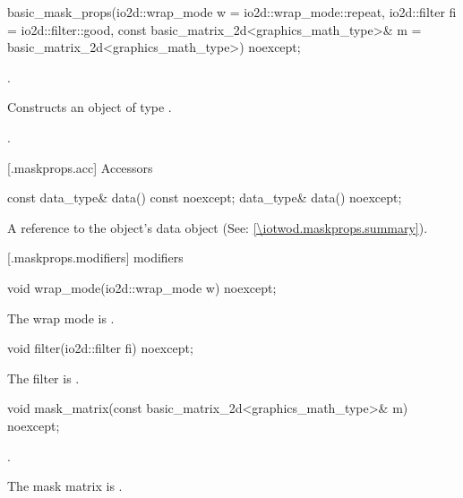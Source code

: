 %
\begin{itemdecl}
basic_mask_props(io2d::wrap_mode w = io2d::wrap_mode::repeat,
  io2d::filter fi = io2d::filter::good,
  const basic_matrix_2d<graphics_math_type>& m = basic_matrix_2d<graphics_math_type>{}) noexcept;
\end{itemdecl}
\begin{itemdescr}
\requires
{}.

\pnum
\effects
Constructs an object of type .

\pnum
\postconditions
{}.
\end{itemdescr}

 [\iotwod.maskprops.acc] {Accessors}

%
\begin{itemdecl}
const data_type& data() const noexcept;
data_type& data() noexcept;
\end{itemdecl}
\begin{itemdescr}
\pnum
\returns A reference to the  object's data object (See: \ref{\iotwod.maskprops.summary}).
\end{itemdescr}

 [\iotwod.maskprops.modifiers] { modifiers}

%
\begin{itemdecl}
void wrap_mode(io2d::wrap_mode w) noexcept;
\end{itemdecl}
\begin{itemdescr}
\pnum
\effects
The wrap mode is .
\end{itemdescr}

%
\begin{itemdecl}
void filter(io2d::filter fi) noexcept;
\end{itemdecl}
\begin{itemdescr}
\pnum
\effects
The filter is .
\end{itemdescr}

%
\begin{itemdecl}
void mask_matrix(const basic_matrix_2d<graphics_math_type>& m) noexcept;
\end{itemdecl}
\begin{itemdescr}
\pnum
\requires
{}.

\pnum
\effects
The mask matrix is .
\end{itemdescr}

